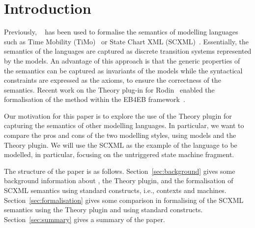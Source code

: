 \section{Introduction}

Previously, \EventB~\cite{abrial10} has been used to formalise the semantics of modelling languages such as Time Mobility (TiMo)~\cite{DBLP:conf/iceccs/CiobanuHS14} or State Chart XML (SCXML)~\cite{DBLP:conf/ictac/WrightHSB23}. Essentially, the semantics of the languages are captured as discrete transition systems represented by the \EventB models. An advantage of this approach is that the generic properties of the semantics can be captured as invariants of the \EventB models while the syntactical constraints are expressed as the axioms, to ensure the correctness of the semantics. Recent work on the Theory plug-in for Rodin~\cite{DBLP:journals/corr/HoangVSBWB17} enabled the formalisation of the \EventB method within the EB4EB framework~\cite{DBLP:conf/nfm/RiviereSAD23}.

Our motivation for this paper is to explore the use of the Theory plugin for capturing the semantics of other modelling languages. In particular, we want to compare the pros and cons of the two modelling styles, using \EventB models and the Theory plugin. We will use the SCXML as the example of the language to be modelled, in particular, focusing on the untriggered state machine fragment.

The structure of the paper is as follows. Section~\ref{sec:background} gives some background information about \EventB, the Theory plugin, and the formalisation of SCXML semantics using \EventB standard constructs, i.e., contexts and machines. Section~\ref{sec:formalisation} gives some comparison in formalising of the SCXML semantics using the Theory plugin and using \EventB standard constructs. Section~\ref{sec:summary} gives a summary of the paper.
